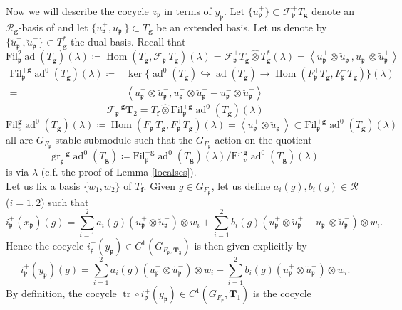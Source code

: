 \documentclass[10pt]{amsart}
\numberwithin{equation}{section}
\theoremstyle{definition}
\theoremstyle{remark} %
\newcommand{\ad}{\operatorname{ad}}
\newcommand{\Fil}{\mathrm{Fil}}
\newcommand{\Hom}{\operatorname{Hom}}
\newcommand{\f}{\mathbf{f}}
\newcommand{\scrF}{\mathscr{F}}
\newcommand{\g}{\mathbf{g}}
\newcommand{\p}{\mathfrak{p}}
\newcommand{\R}{\mathcal{R}}
\newcommand{\T}{\mathbf{T}}
\newcommand{\uu}{\breve{u}}
\begin{document}
		\subsubsection{}
		Now we will describe the cocycle $ z_{\p} $ in terms of $ y_{\p} $.
		Let $\{ u^+_{\p} \} \subset \scrF^+_{\p} T_\g$ denote an $\R_\g$-basis of and let $\{ u^+_{\p} , u^-_{\p}  \} \subset  T_\g $ be an extended basis. Let us denote by $ \{ \breve{u}^+_{\p} , \breve{u}^-_{\p}  \} \subset  T_\g^*  $ the dual basis. Recall that 
		$$ \mathrm{Fil}^2_{\p}\ad(T_\g)(\lambda) \coloneqq \Hom(T_\g,\scrF^{+}_{\p} T_\g)(\lambda) = \scrF^{+}_{\p} T_\g \widehat{\otimes} T_\g^* (\lambda) =\left\langle u^+_{\p} \otimes \breve{u}^-_{\p}, u^+_{\p} \otimes \uu^+_{\p} \right\rangle $$
		\begin{equation*}
			\begin{split}
				\mathrm{Fil}^{+\g}_{\p} \ad^0(T_\g)(\lambda) \coloneqq & \ker \{\ad^0(T_\g) \hookrightarrow \ad(T_\g) \rightarrow \Hom(F_{\p}^+ T_\g,F_{\p}^- T_\g) \}(\lambda) \\
				= & \left\langle u^+_{\p} \otimes \breve{u}^-_{\p}, u^+_{\p} \otimes \uu^+_{\p}  - u^-_{\p} \otimes \uu^-_{\p} \right\rangle
			\end{split}
		\end{equation*}
		$$ \scrF^{+\g}_{\p} \T_{2} = T_\f \widehat{\otimes} \Fil^{+\g}_{\p} \ad^0(T_\g)(\lambda)  $$
		$$ \Fil^{\g}_{v}\ad^0(T_\g)(\lambda) \coloneqq \Hom(F_{\p}^- T_\g,F_{\p}^+  T_\g)(\lambda) = \left\langle u^+_{\p} \otimes \breve{u}^-_{\p} \right\rangle \subset 	\mathrm{Fil}^{+\g}_{\p} \ad^0(T_\g)(\lambda) $$
		all are $G_{F_{\p}}$-stable submodule such that the $G_{F_{\p}}$ action on the quotient  
		$$ \mathrm{gr}^{+\g}_{\p} \ad^0(T_\g) \coloneqq \mathrm{Fil}^{+\g}_{\p} \ad^0(T_\g)(\lambda) / \Fil^{\g}_{v}\ad^0(T_\g)(\lambda) $$
		is via $\lambda$ (c.f. the proof of Lemma \ref{localses}). \\
		Let us fix a basis $\{ w_1,w_2 \}$ of $T_\f$. Given $g \in G_{F_{\p}}$, let us define $a_i(g), b_i(g)  \in \R$ ($i = 1,2$) such that 
		$$ i_{\p}^+(x_{\p})(g) = \sum_{i=1}^{2} a_i(g)(u^+_{\p} \otimes \breve{u}^-_{\p})\otimes w_i + \sum_{i=1}^{2} b_i(g)( u^+_{\p} \otimes \uu^+_{\p}  - u^-_{\p} \otimes \uu^-_{\p})\otimes w_i . $$
		Hence the cocycle $i_{\p}^+(y_{\p}) \in C^1(G_{F_{\p},\T_{3}}) $ is then given explicitly by  
		$$ i_{\p}^+(y_{\p})(g) = \sum_{i=1}^{2} a_i(g)(u^+_{\p} \otimes \breve{u}^-_{\p})\otimes w_i + \sum_{i=1}^{2} b_i(g)( u^+_{\p} \otimes \uu^+_{\p} )\otimes w_i . $$
		By definition, the cocycle \( \operatorname{tr} \circ i_{\p}^+(y_{\p}) \in C^1(G_{F_{\p}}, \T_{1}) \) is the cocycle 
\end{document}

